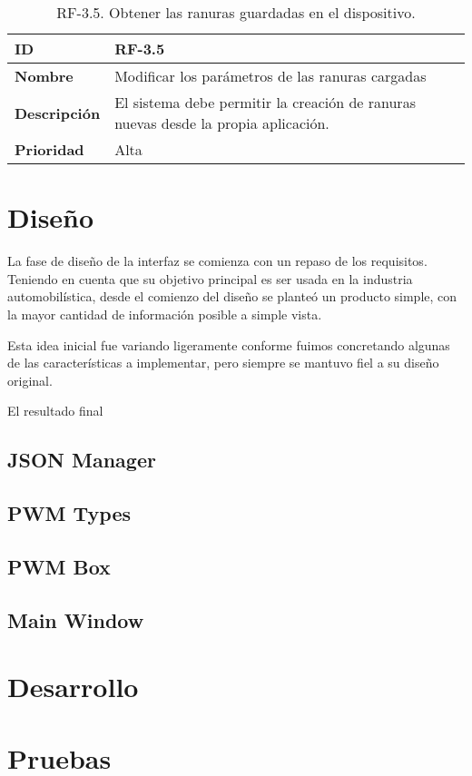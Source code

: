 \begin{table}[h!]
    \centering
    \begin{tabular}{|m{2.5cm}|m{9.27cm}|}
        \hline
        \textbf{ID} & RF-3.5 \\
        \hline
        \textbf{Nombre} & Modificar los parámetros de las ranuras cargadas \\
        \hline
        \textbf{Descripción} & El sistema debe permitir la creación de ranuras nuevas desde la propia aplicación. \\
        \hline
        \textbf{Prioridad} & Alta \\
        \hline
    \end{tabular}
    \caption{RF-3.5. Obtener las ranuras guardadas en el dispositivo.}
\end{table}

\section{Diseño}

La fase de diseño de la interfaz se comienza con un repaso de los requisitos. Teniendo en cuenta que su objetivo principal es ser usada en la industria automobilística, desde el comienzo del diseño se planteó un producto simple, con la mayor cantidad de información posible a simple vista.



Esta idea inicial fue variando ligeramente conforme fuimos concretando algunas de las características a implementar, pero siempre se mantuvo fiel a su diseño original.

El resultado final


\subsection{JSON Manager}



\subsection{PWM Types}



\subsection{PWM Box}



\subsection{Main Window}




\section{Desarrollo}



\section{Pruebas}


